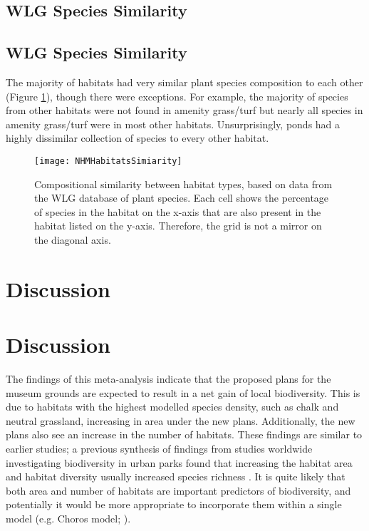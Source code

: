 \subsection{WLG Species Similarity}%
\else
\subsection*{WLG Species Similarity}
\fi
The majority of habitats had very similar plant species composition to each other (Figure \ref{fig:wlgsimilarity}), though there were exceptions. For example, the majority of species from other habitats were not found in amenity grass/turf but nearly all species in amenity grass/turf were in most other habitats. Unsurprisingly, ponds had a highly dissimilar collection of species to every other habitat.


\begin{figure}[t]
	\centering
	\texttt{[image: NHMHabitatsSimiarity]}
	\caption{Compositional similarity between habitat types, based on data from the WLG database of plant species. Each cell shows the percentage of species in the habitat on the x-axis that are also present in the habitat listed on the y-axis. Therefore, the grid is not a mirror on the diagonal axis.}
   	 \label{fig:wlgsimilarity}
\end{figure}

\ifappendixStyle %
\section{Discussion}%
\else
\section*{Discussion}
\fi

The findings of this meta-analysis indicate that the proposed plans for the museum grounds are expected to result in a net gain of local biodiversity. This is due to habitats with the highest modelled species density, such as chalk and neutral grassland, increasing in area under the new plans. Additionally, the new plans also see an increase in the number of habitats. These findings are similar to earlier studies; a previous synthesis of findings from studies worldwide investigating biodiversity in urban parks found that increasing the habitat area and habitat diversity usually increased species richness \citep{Nielsen:2014ue}.  It is quite likely that both area and number of habitats are important predictors of biodiversity, and potentially it would be more appropriate to incorporate them within a single model (e.g. Choros model; \citealt{Triantis:2003jb}).

